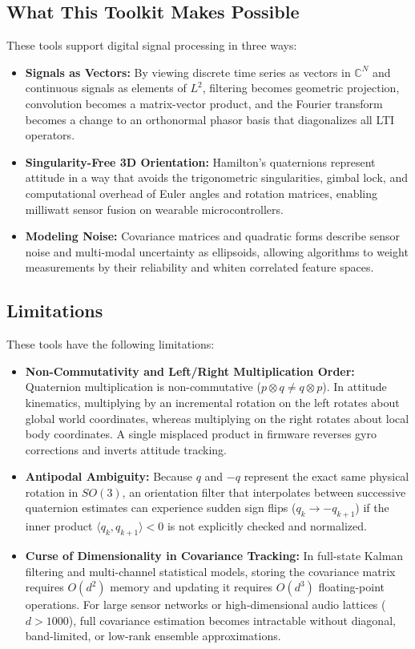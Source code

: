 \subsection{What This Toolkit Makes Possible}

These tools support digital signal processing in three ways:
\begin{itemize}
  \item \textbf{Signals as Vectors:} By viewing discrete time series as vectors in $\mathbb{C}^N$ and continuous signals as elements of $L^2$, filtering becomes geometric projection, convolution becomes a matrix-vector product, and the Fourier transform becomes a change to an orthonormal phasor basis that diagonalizes all LTI operators.
  \item \textbf{Singularity-Free 3D Orientation:} Hamilton's quaternions represent attitude in a way that avoids the trigonometric singularities, gimbal lock, and computational overhead of Euler angles and rotation matrices, enabling milliwatt sensor fusion on wearable microcontrollers.
  \item \textbf{Modeling Noise:} Covariance matrices and quadratic forms describe sensor noise and multi-modal uncertainty as ellipsoids, allowing algorithms to weight measurements by their reliability and whiten correlated feature spaces.
\end{itemize}

\subsection{Limitations}

These tools have the following limitations:
\begin{itemize}
  \item \textbf{Non-Commutativity and Left/Right Multiplication Order:} Quaternion multiplication is non-commutative ($p \otimes q \neq q \otimes p$). In attitude kinematics, multiplying by an incremental rotation on the left rotates about global world coordinates, whereas multiplying on the right rotates about local body coordinates. A single misplaced product in firmware reverses gyro corrections and inverts attitude tracking.
  \item \textbf{Antipodal Ambiguity:} Because $q$ and $-q$ represent the exact same physical rotation in $SO(3)$, an orientation filter that interpolates between successive quaternion estimates can experience sudden sign flips ($q_k \to -q_{k+1}$) if the inner product $\langle q_k, q_{k+1} \rangle < 0$ is not explicitly checked and normalized.
  \item \textbf{Curse of Dimensionality in Covariance Tracking:} In full-state Kalman filtering and multi-channel statistical models, storing the covariance matrix requires $O(d^2)$ memory and updating it requires $O(d^3)$ floating-point operations. For large sensor networks or high-dimensional audio lattices ($d > 1000$), full covariance estimation becomes intractable without diagonal, band-limited, or low-rank ensemble approximations.
\end{itemize}

